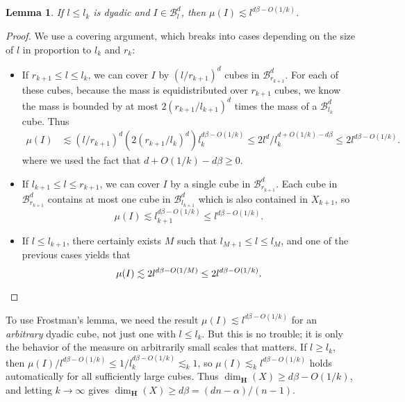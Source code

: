 \documentclass[usenames,dvipsnames]{article}
\theoremstyle{plain}
\newtheorem{lemma}{Lemma}
\theoremstyle{plain}
\begin{document}
\begin{lemma}
	If $l \leq l_k$ is dyadic and $I \in \mathcal{B}^d_l$, then $\mu(I) \lesssim l^{d\beta - O(1/k)}$.
\end{lemma}
\begin{proof}
	We use a covering argument, which breaks into cases depending on the size of $l$ in proportion to $l_k$ and $r_k$:
	\begin{itemize}
		\item If $r_{k+1} \leq l \leq l_k$, we can cover $I$ by $(l/r_{k+1})^d$ cubes in $\mathcal{B}^d_{r_{k+1}}$. For each of these cubes, because the mass is equidistributed over $r_{k+1}$ cubes, we know the mass is bounded by at most $2(r_{k+1}/l_{k+1})^d$ times the mass of a $\mathcal{B}^d_{l_k}$ cube. Thus
		\begin{align*}
			\mu(I) &\lesssim (l/r_{k+1})^d (2(r_{k+1}/l_k)^d) l_k^{d \beta - O(1/k)} \leq 2 l^d / l_k^{d + O(1/k) - d \beta} \leq 2 l^{d \beta - O(1/k)}.
		\end{align*}
		where we used the fact that $d + O(1/k) - d\beta \geq 0$.

		\item If $l_{k+1} \leq l \leq r_{k+1}$, we can cover $I$ by a single cube in $\mathcal{B}^d_{r_{k+1}}$. Each cube in $\mathcal{B}^d_{r_{k+1}}$ contains at most one cube in $\mathcal{B}^d_{l_{k+1}}$ which is also contained in $X_{k+1}$, so
		\[ \mu(I) \lesssim l_{k+1}^{d\beta - O(1/k)} \leq l^{d \beta - O(1/k)}. \]

		\item If $l \leq l_{k+1}$, there certainly exists $M$ such that $l_{M+1} \leq l \leq l_M$, and one of the previous cases yields that
		\[ \mu(I) \lesssim 2 l^{d \beta - O(1/M)} \leq 2 l^{d \beta - O(1/k)}. \qedhere \]
	\end{itemize}
\end{proof}

To use Frostman's lemma, we need the result $\mu(I) \lesssim l^{d \beta - O(1/k)}$ for an {\it arbitrary} dyadic cube, not just one with $l \leq l_k$. But this is no trouble; it is only the behavior of the measure on arbitrarily small scales that matters. If $l \geq l_k$, then $\mu(I)/l^{d \beta - O(1/k)} \leq 1/l_k^{d \beta - O(1/k)} \lesssim_k 1$, so $\mu(I) \lesssim_k l^{d \beta - O(1/k)}$ holds automatically for all sufficiently large cubes. Thus $\dim_{\mathbf{H}}(X) \geq d \beta - O(1/k)$, and letting $k \to \infty$ gives $\dim_{\mathbf{H}}(X) \geq d \beta = (dn - \alpha)/(n-1)$.
\end{document}
